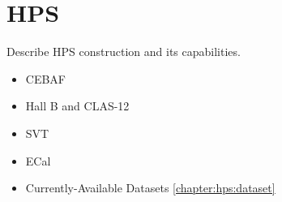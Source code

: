 \chapter{HPS}
\label{chapter:hps:experiment}

Describe HPS construction and its capabilities.
\begin{itemize}
    \item CEBAF \cite{cebaf-2013,cebaf-12GeV-2012,cebaf-opportunities-2012}
    \item Hall B and CLAS-12 \cite{mrsolt-thesis-2020}
    \item SVT
    \item ECal
    \item Currently-Available Datasets \cref{chapter:hps:dataset}
\end{itemize}
